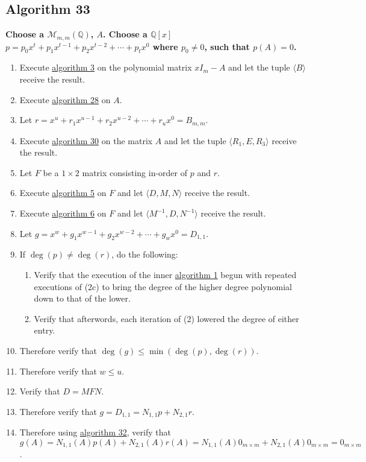 \documentclass[twocolumn]{article}
\begin{document}
		\subsection{Algorithm 33}\label{sec:algorithm 33}
			\textbf{Choose a $\mathcal{M}_{m,m}(\mathbb{Q})$, $A$. Choose a $\mathbb{Q}[x]$ $p=p_0x^t+p_1x^{t-1}+p_2x^{t-2}+\cdots+p_tx^0$ where $p_0\ne 0$, such that $p(A)=0$.}
			\begin{enumerate}
				\item Execute \hyperref[sec:algorithm 3]{algorithm 3} on the polynomial matrix $xI_m-A$ and let the tuple $\langle B\rangle$ receive the result.
				\item Execute \hyperref[sec:algorithm 28]{algorithm 28} on $A$.
				\item Let $r=x^u+r_1x^{u-1}+r_2x^{u-2}+\cdots+r_ux^0=B_{m,m}$.
				\item Execute \hyperref[sec:algorithm 30]{algorithm 30} on the matrix $A$ and let the tuple $\langle R_1,E,R_3\rangle$ receive the result.
				\item Let $F$ be a $1\times 2$ matrix consisting in-order of $p$ and $r$.
				\item Execute \hyperref[sec:algorithm 5]{algorithm 5} on $F$ and let $\langle D,M,N\rangle$ receive the result.
				\item Execute \hyperref[sec:algorithm 6]{algorithm 6} on $F$ and let $\langle M^{-1},D,N^{-1}\rangle$ receive the result.
				\item Let $g=x^w+g_1x^{w-1}+g_2x^{w-2}+\cdots+g_wx^0=D_{1,1}$.
				\item If $\deg(p)\ne\deg(r)$, do the following:
				\begin{enumerate}
					\item Verify that the execution of the inner \hyperref[sec:algorithm 1]{algorithm 1} begun with repeated executions of (2c) to bring the degree of the higher degree polynomial down to that of the lower.
					\item Verify that afterwords, each iteration of (2) lowered the degree of either entry.
				\end{enumerate}
				\item Therefore verify that $\deg(g)\le\min(\deg(p),\deg(r))$.
				\item Therefore verify that $w\le u$.
				\item Verify that $D=MFN$.
				\item Therefore verify that $g=D_{1,1}=N_{1,1}p+N_{2,1}r$.
				\item Therefore using \hyperref[sec:algorithm 32]{algorithm 32}, verify that $g(A)=N_{1,1}(A)p(A)+N_{2,1}(A)r(A)=N_{1,1}(A)0_{m\times m}+N_{2,1}(A)0_{m\times m}=0_{m\times m}$.

\end{enumerate}
\end{document}
